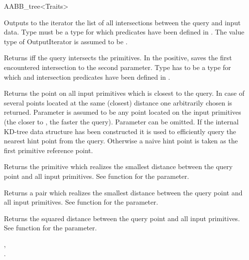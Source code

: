 \begin{ccRefClass}{AABB_tree<Traits>}
	
{Outputs to the iterator the list of all intersections between the query and input data. Type  must be a type for which  predicates have been defined in . The value type of OutputIterator is assumed to be .}



{Returns  iff the query intersects the primitives. In the positive, saves the first encountered intersection to the second parameter. Type  has to be a type for which  and intersection predicates have been defined in .}



{Returns the point on all input primitives which is closest to the query. In case of several points located at the same (closest) distance one arbitrarily chosen is returned.  Parameter  is assumed to be any point located on the input primitives (the closer  to , the faster the query). Parameter  can be omitted. If the internal KD-tree data structure has been constructed it is used to efficiently query the nearest hint point from the query. Otherwise a naive hint point is taken as the first primitive reference point. }

{Returns the primitive which realizes the smallest distance between the query point and all input primitives. See  function for the  parameter. }

{Returns a pair  which realizes the smallest distance between the query point and all input primitives. See  function for the  parameter. }

{Returns the squared distance between the query point and all input primitives. See  function for the  parameter. }

\ccSeeAlso

, \\
.

\end{ccRefClass}

\ccRefPageEnd

